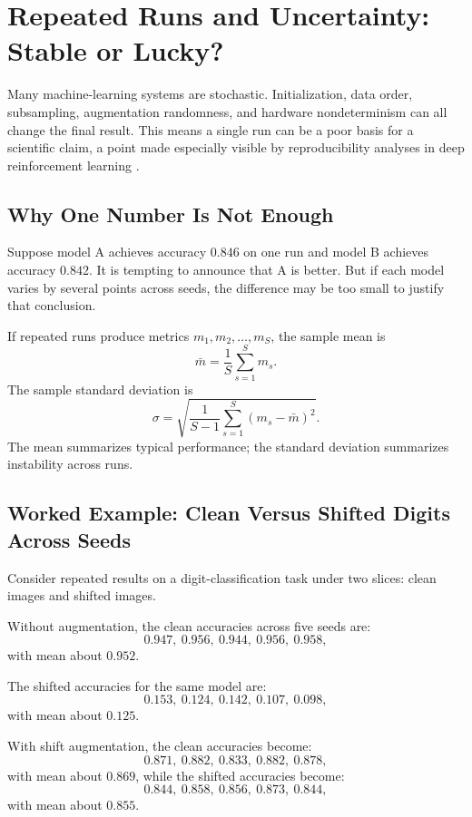 \section{Repeated Runs and Uncertainty: Stable or Lucky?}

Many machine-learning systems are stochastic. Initialization, data order, subsampling, augmentation randomness, and hardware nondeterminism can all change the final result. This means a single run can be a poor basis for a scientific claim, a point made especially visible by reproducibility analyses in deep reinforcement learning \citep{henderson2018}.

\subsection{Why One Number Is Not Enough}

Suppose model A achieves accuracy $0.846$ on one run and model B achieves accuracy $0.842$. It is tempting to announce that A is better. But if each model varies by several points across seeds, the difference may be too small to justify that conclusion.

\begin{prereqbridge}
If repeated runs produce metrics $m_1, m_2, \ldots, m_S$, the sample mean is
\[
\bar{m} = \frac{1}{S}\sum_{s=1}^{S} m_s.
\]
The sample standard deviation is
\[
\sigma = \sqrt{\frac{1}{S-1}\sum_{s=1}^{S}(m_s - \bar{m})^2}.
\]
The mean summarizes typical performance; the standard deviation summarizes instability across runs.
\end{prereqbridge}

\subsection{Worked Example: Clean Versus Shifted Digits Across Seeds}

Consider repeated results on a digit-classification task under two slices: clean images and shifted images.

Without augmentation, the clean accuracies across five seeds are:
\[
0.947,\ 0.956,\ 0.944,\ 0.956,\ 0.958,
\]
with mean about $0.952$.

The shifted accuracies for the same model are:
\[
0.153,\ 0.124,\ 0.142,\ 0.107,\ 0.098,
\]
with mean about $0.125$.

With shift augmentation, the clean accuracies become:
\[
0.871,\ 0.882,\ 0.833,\ 0.882,\ 0.878,
\]
with mean about $0.869$,
while the shifted accuracies become:
\[
0.844,\ 0.858,\ 0.856,\ 0.873,\ 0.844,
\]
with mean about $0.855$.

